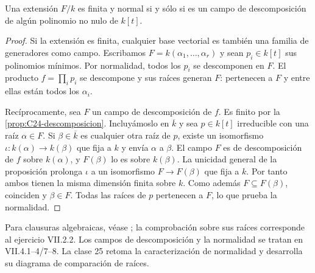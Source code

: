 \begin{teo}\label{teo:C24-normal}
Una extensión $F/k$ es finita y normal si y sólo si es un campo de descomposición de algún polinomio no nulo de $k[t]$.
\end{teo}
\begin{proof}
Si la extensión es finita, cualquier base vectorial es también una familia de generadores como campo. Escribamos $F=k(\alpha_1,\ldots,\alpha_r)$ y sean $p_i\in k[t]$ sus polinomios mínimos. Por normalidad, todos los $p_i$ se descomponen en $F$. El producto $f=\prod_i p_i$ se descompone y sus raíces generan $F$: pertenecen a $F$ y entre ellas están todos los $\alpha_i$.

Recíprocamente, sea $F$ un campo de descomposición de $f$. Es finito por la \cref{prop:C24-descomposicion}. Incluyámoslo en $\overline k$ y sea $p\in k[t]$ irreducible con una raíz $\alpha\in F$. Si $\beta\in\overline k$ es cualquier otra raíz de $p$, existe un isomorfismo $\iota:k(\alpha)\to k(\beta)$ que fija a $k$ y envía $\alpha$ a $\beta$. El campo $F$ es de descomposición de $f$ sobre $k(\alpha)$, y $F(\beta)$ lo es sobre $k(\beta)$. La unicidad general de la proposición prolonga $\iota$ a un isomorfismo $F\to F(\beta)$ que fija a $k$. Por tanto ambos tienen la misma dimensión finita sobre $k$. Como además $F\subseteq F(\beta)$, coinciden y $\beta\in F$. Todas las raíces de $p$ pertenecen a $F$, lo que prueba la normalidad.
\end{proof}

\begin{obs}
Para clausuras algebraicas, véase \citet[cap.~VII, apartado 2.1, lema 2.1, definición 2.2, teorema 2.3 y resultados 2.4--6/8]{aluffi2009}; la comprobación sobre sus raíces corresponde al ejercicio VII.2.2. Los campos de descomposición y la normalidad se tratan en VII.4.1--4/7--8. La clase 25 retoma la caracterización de normalidad y desarrolla su diagrama de comparación de raíces.
\end{obs}
